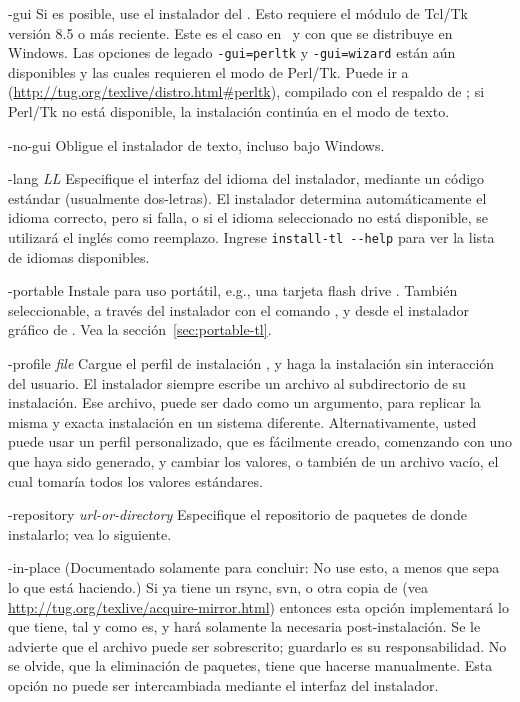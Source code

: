 \documentclass{article}
\begin{document}
\begin{ttdescription}
\item[-gui] Si es posible, use el instalador del \GUI{}. Esto requiere
		el módulo de Tcl/Tk versión 8.5 o más reciente.  Este es el
		caso en \MacOSX\ y con \TL{} que se distribuye en Windows.  Las
		opciones de legado \texttt{-gui=perltk} y \texttt{-gui=wizard}
		están aún disponibles y las cuales requieren el modo de
		Perl/Tk. Puede ir a
		(\url{http://tug.org/texlive/distro.html#perltk}), compilado
		con el respaldo de ; si Perl/Tk no está disponible,
		la instalación continúa en el modo de texto. 

\item[-no-gui] Obligue el instalador de texto, incluso bajo Windows. 

\item[-lang {\sl LL}] Especifique el interfaz del idioma del
	instalador, mediante un código estándar (usualmente
	dos-letras). El instalador determina automáticamente el idioma
	correcto, pero si falla, o si el idioma seleccionado no está
	disponible, se utilizará el inglés como reemplazo. Ingrese
	\verb|install-tl --help| para ver la lista de idiomas
	disponibles.

\item[-portable] Instale para uso portátil, e.g., una tarjeta flash
	drive \USB{}. También seleccionable, a través del instalador
	con el comando , y desde el instalador gráfico de
	\GUI{}. Vea la sección~\ref{sec:portable-tl}.

\item[-profile {\sl file}] Cargue el perfil de instalación ,
	y haga la instalación sin interacción del usuario. El
	instalador siempre escribe un archivo
	 al subdirectorio  de
	su instalación. Ese archivo, puede ser dado como un argumento,
	para replicar la misma y exacta instalación en un sistema
	diferente. Alternativamente, usted puede usar un perfil
	personalizado, que es fácilmente creado, comenzando con uno
	que haya sido generado, y cambiar los valores, o también de un
	archivo vacío, el cual tomaría todos los valores estándares.

\item[-repository {\sl url-or-directory}] Especifique el repositorio
	de paquetes de donde instalarlo; vea lo siguiente.


\item[-in-place] (Documentado solamente para concluir: No use esto, a
	menos que sepa lo que está haciendo.) Si ya tiene un rsync,
	svn, o otra copia de \TL{} (vea
	\url{http://tug.org/texlive/acquire-mirror.html}) entonces
	esta opción implementará lo que tiene, tal y como es, y hará
	solamente la necesaria post-instalación. Se le advierte que el
	archivo  puede ser sobrescrito;
	guardarlo es su responsabilidad. No se olvide, que la
	eliminación de paquetes, tiene que hacerse manualmente. Esta
	opción no puede ser intercambiada mediante el interfaz del
	instalador. 
\end{ttdescription}
\end{document}
